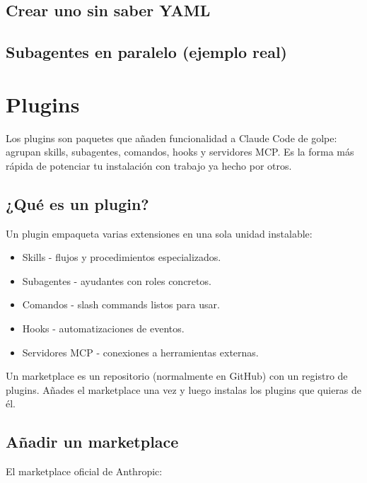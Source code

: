 \documentclass[11pt,a4paper]{book}
\begin{document}
\section{Crear uno sin saber YAML}
\section{Subagentes en paralelo (ejemplo real)}
\chapter{Plugins}
Los plugins son paquetes que añaden funcionalidad a Claude Code de golpe: agrupan skills, subagentes, comandos, hooks y servidores MCP. Es la forma más rápida de potenciar tu instalación con trabajo ya hecho por otros.

\section{¿Qué es un plugin?}
Un plugin empaqueta varias extensiones en una sola unidad instalable:

\begin{itemize}\item Skills - flujos y procedimientos especializados.\end{itemize}
\begin{itemize}\item Subagentes - ayudantes con roles concretos.\end{itemize}
\begin{itemize}\item Comandos - slash commands listos para usar.\end{itemize}
\begin{itemize}\item Hooks - automatizaciones de eventos.\end{itemize}
\begin{itemize}\item Servidores MCP - conexiones a herramientas externas.\end{itemize}
Un marketplace es un repositorio (normalmente en GitHub) con un registro de plugins. Añades el marketplace una vez y luego instalas los plugins que quieras de él.

\section{Añadir un marketplace}
El marketplace oficial de Anthropic:
\end{document}
